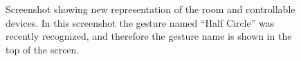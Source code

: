 \begin{figure}[!htb]%
    \centering
    \caption{Screenshot showing new representation of the room and controllable devices. In this screenshot the gesture named ``Half Circle'' was recently recognized, and therefore the gesture name is shown in the top of the screen.}
    \label{fig:prototype3-room-screenshot}
\end{figure}

